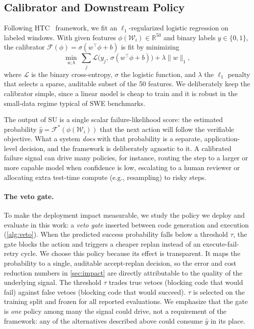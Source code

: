 \documentclass[11pt]{article}
\begin{document}
\subsection{Calibrator and Downstream Policy}
\label{sec:calibrator}

Following HTC~\citep{zhang2025htc} framework, we fit an $\ell_1$-regularized logistic
regression on labeled windows. With given features
$\phi(\mathcal{W}_i) \in \mathbb{R}^{50}$ and binary labels $y \in \{0,1\}$,
the calibrator $\mathcal{F}(\phi) = \sigma(w^\top \phi + b)$ is fit by minimizing
\begin{equation*}
  \min_{w, b}\ \sum_{j} \mathcal{L}\bigl(y_j,\, \sigma(w^\top \phi + b)\bigr)
  + \lambda \lVert w \rVert_1,
  \label{eq:logreg}
\end{equation*}
where $\mathcal{L}$ is the binary cross-entropy, $\sigma$ the logistic function,
and $\lambda$ the $\ell_1$ penalty that selects a sparse, auditable subset of
the 50 features. We deliberately keep the calibrator simple, since a linear model is
cheap to train and it is robust in the small-data regime typical of SWE benchmarks.

The output of SU is a single scalar failure-likelihood score: the estimated probability $\hat{y} =
\mathcal{F}^*(\phi(\mathcal{W}_i))$ that the next action will follow the verifiable objective.
What a system \emph{does} with that probability is a separate, application-level
decision, and the framework is deliberately agnostic to it. A calibrated
failure signal can drive many policies, for instance, routing the step to a larger
or more capable model when confidence is low, escalating to a human reviewer or
allocating extra test-time compute (e.g., resampling) to risky steps.

\paragraph{The veto gate.}
To make the deployment impact measurable, we study the policy we deploy and
evaluate in this work: a \emph{veto gate} inserted between code generation and
execution (\autoref{alg:veto}). When the predicted success probability falls
below a threshold $\tau$, the gate blocks the action and triggers a cheaper
replan instead of an execute-fail-retry cycle. We choose this policy because its
effect is transparent. It maps the probability to a single,
auditable accept-replan decision, so the error and cost reduction numbers in
\autoref{sec:impact} are directly attributable to the quality of the underlying
signal. 
The threshold $\tau$ trades true vetoes (blocking code that would fail) against false vetoes
(blocking code that would succeed). $\tau$ is selected on the training split and frozen for all reported evaluations. We emphasize that the gate is \emph{one} policy among many the signal could drive, not a requirement of the framework: any of the
alternatives described above could consume $\hat{y}$ in its place.
\end{document}
